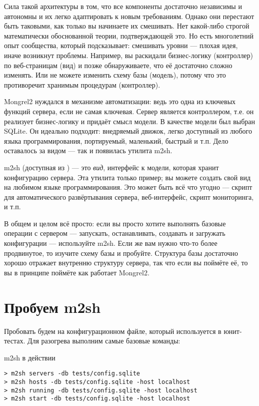 Сила такой архитектуры в том, что все компоненты достаточно независимы
и автономны и их легко адаптировать к новым требованиям. Однако они
перестают быть таковыми, как только вы начинаете их смешивать.  Нет
какой-либо строгой математически обоснованной теории, подтверждающей
это. Но есть многолетний опыт сообщества, который подсказывает:
смешивать уровни --- плохая идея, иначе возникнут проблемы. Например,
вы раскидали бизнес-логику (контроллер) по веб-страницам (вид) и позже
обнаруживаете, что её достаточно сложно изменять.  Или не можете
изменить схему базы (модель), потому что это противоречит хранимым
процедурам (контроллер).

Mongrel2 нуждался в механизме автоматизации: ведь это одна из ключевых
функций сервера, если не самая ключевая. Сервер является контроллером,
т.е.  он реализует бизнес-логику и придаёт смысл модели. В качестве
модели был выбран SQLite. Он идеально подходит: внедряемый движок,
легко доступный из любого языка программирования, портируемый,
маленький, быстрый и т.п. Дело оставалось за видом --- так и появилась
утилита m2sh.

m2sh (доступная из ) --- это \emph{вид}, интерфейс к модели,
которая хранит конфигурацию сервера. Эта утилита только пример; вы можете
создать свой вид на любимом языке программирования. Это может быть всё что
угодно --- скрипт для автоматического развёртывания сервера, веб-интерфейс,
скрипт мониторинга, и т.п.

В общем и целом всё просто: если вы просто хотите выполнять базовые
операции с сервером --- запускать, останавливать, создавать и
загружать конфигурации --- используйте m2sh. Если же вам нужно что-то
более продвинутое, то изучите схему базы и пробуйте. Структура базы
достаточно хорошо отражает внутренню структуру сервера, так что если
вы поймёте её, то вы в принципе поймёте как работает Mongrel2.

\section{Пробуем m2sh}

Пробовать будем на конфигурационном файле, который используется в
юнит-тестах. Для разогрева выполним самые базовые команды:

\begin{code}{m2sh в действии}
\begin{lstlisting}
> m2sh servers -db tests/config.sqlite
> m2sh hosts -db tests/config.sqlite -host localhost
> m2sh running -db tests/config.sqlite -host localhost
> m2sh start -db tests/config.sqlite -host localhost
\end{lstlisting}
\end{code}

